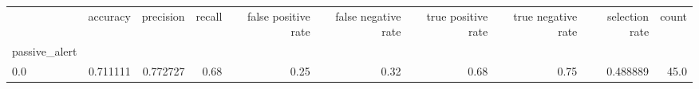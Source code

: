 \begin{tabular}{lrrrrrrrrr}
\toprule
{} &  accuracy &  precision &  recall &  false positive rate &  false negative rate &  true positive rate &  true negative rate &  selection rate &  count \\
passive\_alert &           &            &         &                      &                      &                     &                     &                 &        \\
\midrule
0.0           &  0.711111 &   0.772727 &    0.68 &                 0.25 &                 0.32 &                0.68 &                0.75 &        0.488889 &   45.0 \\
\bottomrule
\end{tabular}
